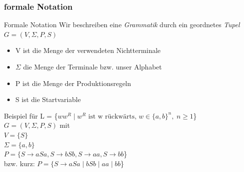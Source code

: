 %
%
%
%

\subsubsection{formale Notation}
\begin{frame}[fragile]{Formale Notation}
    Wir beschreiben eine \alert{\emph{Grammatik}} durch ein geordnetes \alert{\emph{Tupel}} $G = (V, \Sigma, P, S)$
    \begin{itemize}
        \item V ist die Menge der verwendeten Nichtterminale
        \item $\Sigma$ die Menge der Terminale bzw. unser Alphabet
        \item P ist die Menge der Produktionsregeln
        \item S ist die Startvariable
    \end{itemize}
    \begin{exampleblock}{Beispiel für  L = \{$ww^R \mid w^R\text{ ist w rückwärts, }w \in \{a, b\}^n, \; n \geq 1$\}}
        $G = (V,\Sigma,P,S)$ mit\\
        $V = \{S\}$\\
        $\Sigma = \{a,b\}$\\
        $P = \{S \rightarrow aSa, S \rightarrow bSb, S \rightarrow aa, S \rightarrow bb$\}\\
        \qquad bzw. kurz: $P = \{S \rightarrow aSa\;|\;bSb\;|\;aa\;|\;bb$\}
    \end{exampleblock}
\end{frame}

